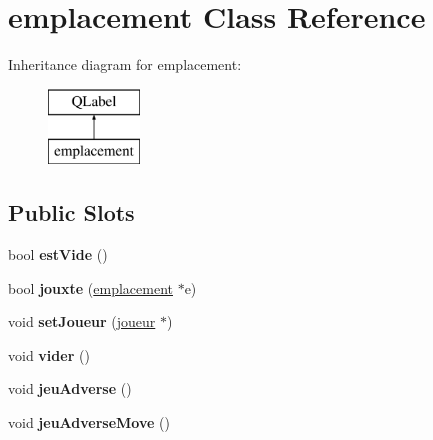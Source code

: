 \hypertarget{classemplacement}{\section{emplacement Class Reference}
\label{classemplacement}
}
Inheritance diagram for emplacement\-:\begin{figure}[H]
\begin{center}
\leavevmode
\includegraphics[height=2.000000cm]{classemplacement}
\end{center}
\end{figure}
\subsection*{Public Slots}
\begin{DoxyCompactItemize}
\item 
\hypertarget{classemplacement_afd15b612d02b7cbfd0480b5b380c2b07}{bool {\bfseries est\-Vide} ()}\label{classemplacement_afd15b612d02b7cbfd0480b5b380c2b07}

\item 
\hypertarget{classemplacement_a70e22f75b934e4daa40582708c4e01f5}{bool {\bfseries jouxte} (\hyperlink{classemplacement}{emplacement} $\ast$e)}\label{classemplacement_a70e22f75b934e4daa40582708c4e01f5}

\item 
\hypertarget{classemplacement_a9e57590839f9c185d962030b221b8ea1}{void {\bfseries set\-Joueur} (\hyperlink{classjoueur}{joueur} $\ast$)}\label{classemplacement_a9e57590839f9c185d962030b221b8ea1}

\item 
\hypertarget{classemplacement_ada71fd6bec4969e4ef5be1a610d712a4}{void {\bfseries vider} ()}\label{classemplacement_ada71fd6bec4969e4ef5be1a610d712a4}

\item 
\hypertarget{classemplacement_aae4d4694984d645ddb397b5847032fa0}{void {\bfseries jeu\-Adverse} ()}\label{classemplacement_aae4d4694984d645ddb397b5847032fa0}

\item 
\hypertarget{classemplacement_aa786f80d5617b15318e898f2ceacbe97}{void {\bfseries jeu\-Adverse\-Move} ()}\label{classemplacement_aa786f80d5617b15318e898f2ceacbe97}

\end{DoxyCompactItemize}
